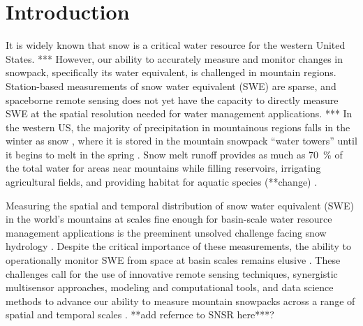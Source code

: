 
\hypertarget{ch1}{%
\chapter{Introduction}\label{ch1}}


It is widely known that snow is a critical water resource for the western United States. 
*** However, our ability to accurately measure and monitor changes in snowpack, specifically its water equivalent, is challenged in mountain regions. Station-based measurements of snow water equivalent (SWE) are sparse, and spaceborne remote sensing does not yet have the capacity to directly measure SWE at the spatial resolution needed for water management applications. ***
In the western US, the majority of precipitation in mountainous regions falls in the winter as snow \citep{serrezeCharacteristicsWesternUnited1999}, where it is stored in the mountain snowpack “water towers” until it begins to melt in the spring \citep{immerzeelImportanceVulnerabilityWorld2020,viviroliIncreasingDependenceLowland2020}. Snow melt runoff provides as much as 70~\% of the total water for areas near mountains \citep{liHowMuchRunoff2017} while filling reservoirs, irrigating agricultural fields, and providing habitat for aquatic species (**change) \citep{yarnellEcologyManagementSpring2010}. 

Measuring the spatial and temporal distribution of snow water equivalent (SWE) in the world’s mountains at scales fine enough for basin-scale water resource management applications is the preeminent unsolved challenge facing snow hydrology \citep{dozierEstimatingSpatialDistribution2016}. Despite the critical importance of these measurements, the ability to operationally monitor SWE from space at basin scales remains elusive \citep{lettenmaierInroadsRemoteSensing2015}. These challenges call for the use of innovative remote sensing techniques, synergistic multisensor approaches, modeling and computational tools, and data science methods to advance our ability to measure mountain snowpacks across a range of spatial and temporal scales \citep{dozierMountainHydrologySnow2011}. 
**add refernce to SNSR here***?

